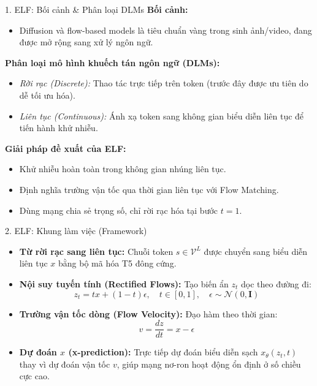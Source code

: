 \begin{frame}{1. ELF: Bối cảnh \& Phân loại DLMs}
    \textbf{Bối cảnh:}
    \begin{itemize}
        \item Diffusion và flow-based models là tiêu chuẩn vàng trong sinh ảnh/video, đang được mở rộng sang xử lý ngôn ngữ.
    \end{itemize}
    \vspace{0.2cm}
    \textbf{Phân loại mô hình khuếch tán ngôn ngữ (DLMs):}
    \begin{itemize}
        \item \textit{Rời rạc (Discrete):} Thao tác trực tiếp trên token (trước đây được ưu tiên do dễ tối ưu hóa).
        \item \textit{Liên tục (Continuous):} Ánh xạ token sang không gian biểu diễn liên tục để tiến hành khử nhiễu.
    \end{itemize}
    \vspace{0.2cm}
    \textbf{Giải pháp đề xuất của ELF:}
    \begin{itemize}
        \item Khử nhiễu hoàn toàn trong không gian nhúng liên tục.
        \item Định nghĩa trường vận tốc qua thời gian liên tục với Flow Matching.
        \item Dùng mạng chia sẻ trọng số, chỉ rời rạc hóa tại bước $t = 1$.
    \end{itemize}
\end{frame}

\begin{frame}{2. ELF: Khung làm việc (Framework)}
    \begin{itemize}
        \item \textbf{Từ rời rạc sang liên tục:} Chuỗi token $s \in \mathcal{V}^L$ được chuyển sang biểu diễn liên tục $x$ bằng bộ mã hóa T5 đông cứng.
        \item \textbf{Nội suy tuyến tính (Rectified Flows):} Tạo biến ẩn $z_t$ dọc theo đường đi:
        $$z_t = t x + (1 - t)\epsilon, \quad t \in [0, 1], \quad \epsilon \sim \mathcal{N}(0, \mathbf{I})$$
        \item \textbf{Trường vận tốc dòng (Flow Velocity):} Đạo hàm theo thời gian:
        $$v = \frac{dz}{dt} = x - \epsilon$$
        \item \textbf{Dự đoán $x$ (x-prediction):} Trực tiếp dự đoán biểu diễn sạch $x_\theta(z_t, t)$ thay vì dự đoán vận tốc $v$, giúp mạng nơ-ron hoạt động ổn định ở số chiều cực cao.
    \end{itemize}
\end{frame}

